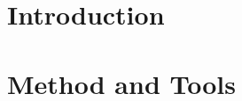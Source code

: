 



%

\chapter{Introduction}
\label{chap:intro}
\thispagestyle{headings}


\chapter{Method and Tools}
\label{chap:method}
\thispagestyle{headings}


%

%

%

%

\newpage
{}
\def\rightmark{Bibliography}
\def\leftmark{Bibliography}
\renewcommand*{\bibname}{\centerline{\Huge{\bfseries{\scshape{Bibliography}}}}}




